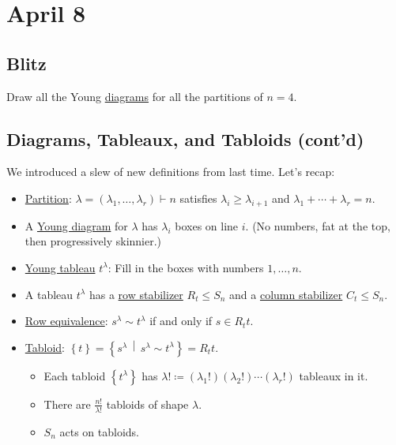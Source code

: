 \documentclass[12pt]{article}
\newcommand\paren[1]{\left( #1 \right)}
\newcommand\setb[1]{\left \{ #1 \right \}}
\theoremstyle{definition}
\begin{document}
\section{April 8}
\subsection{Blitz}
Draw all the Young \underline{diagrams} for all the partitions of $n = 4$.
\subsection{Diagrams, Tableaux, and Tabloids (cont'd)}
We introduced a slew of new definitions from last time. Let's recap:
\begin{itemize}
    \item \underline{Partition}: $\lambda = \paren{ \lambda_1 , \dotsc , \lambda_r} \vdash n$ satisfies $\lambda_i \geq \lambda_{i+1}$ and $\lambda_1 + \dotsb + \lambda_r = n$.
    \item A \underline{Young diagram} for $\lambda$ has $\lambda_i$ boxes on line $i$. (No numbers, fat at the top, then progressively skinnier.)
    \item \underline{Young tableau} $t^{\lambda}$: Fill in the boxes with numbers $1 , \dotsc , n$.
    \item A tableau $t^{\lambda}$ has a \underline{row stabilizer} $R_t \leq S_n$ and a \underline{column stabilizer} $C_t \leq S_n$.
    \item \underline{Row equivalence}: $s^{\lambda} \sim t^{\lambda}$ if and only if $s \in R_t t$.
    \item \underline{Tabloid}: $\setb{t} = \setb{ s^{\lambda} \, \middle| \, s^{\lambda} \sim t^{\lambda} } = R_t t$.
    \begin{itemize}
        \item Each tabloid $\setb{ t^{\lambda} }$ has $\lambda! \coloneqq  \paren{ \lambda_1! } \paren{ \lambda_2! } \dotsm \paren{ \lambda_r! }$ tableaux in it.
        \item There are $\frac{n!}{\lambda!}$ tabloids of shape $\lambda$.
        \item $S_n$ acts on tabloids.
    \end{itemize}
\end{itemize}
\end{document}
